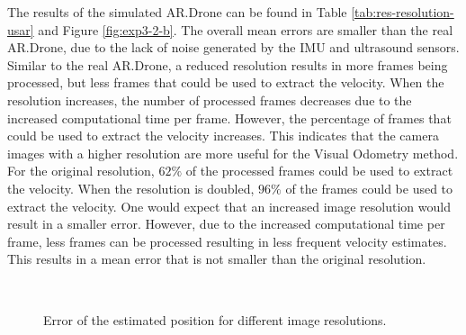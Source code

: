 The results of the simulated AR.Drone can be found in Table \ref{tab:res-resolution-usar} and Figure \ref{fig:exp3-2-b}.
The overall mean errors are smaller than the real AR.Drone, due to the lack of noise generated by the IMU and ultrasound sensors.
Similar to the real AR.Drone, a reduced resolution results in more frames being processed, but less frames that could be used to extract the velocity.
When the resolution increases, the number of processed frames decreases due to the increased computational time per frame.
However, the percentage of frames that could be used to extract the velocity increases.
This indicates that the camera images with a higher resolution are more useful for the Visual Odometry method.
For the original resolution, $62\%$ of the processed frames could be used to extract the velocity. When the resolution is doubled, $96\%$ of the frames could be used to extract the velocity.
One would expect that an increased image resolution would result in a smaller error.
However, due to the increased computational time per frame, less frames can be processed resulting in less frequent velocity estimates.
This results in a mean error that is not smaller than the original resolution.

\begin{figure}[htb!]
  \begin{center}
\\

 \end{center}
  \caption{Error of the estimated position for different image resolutions.}
  \label{fig:exp3-error}
\end{figure}




